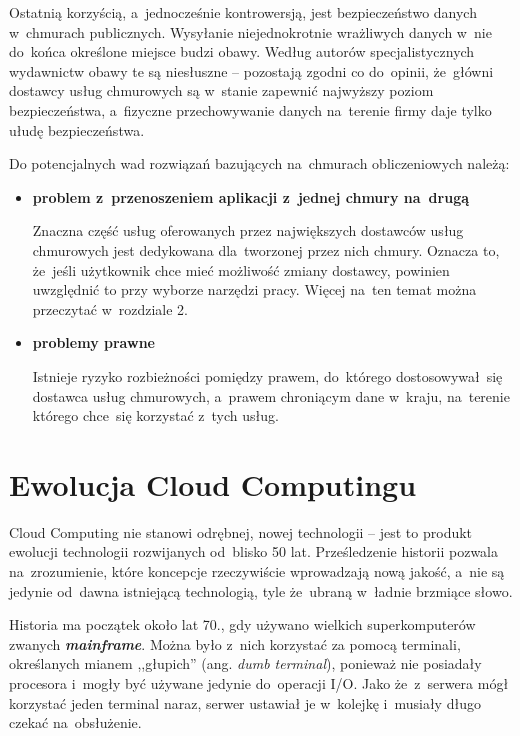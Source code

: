 \documentclass[12pt,a4paper,twoside,titlepage,openright]{book}
\begin{document}
Ostatnią korzyścią, a~jednocześnie kontrowersją, jest bezpieczeństwo danych w~chmurach publicznych. Wysyłanie niejednokrotnie wrażliwych danych w~nie do~końca określone miejsce budzi obawy. Według autorów specjalistycznych wydawnictw\cite{ccCambridge,ccBiznes} obawy te są niesłuszne -- pozostają zgodni co do~opinii, że~główni dostawcy usług chmurowych są w~stanie zapewnić najwyższy poziom bezpieczeństwa, a~fizyczne przechowywanie danych na~terenie firmy daje tylko ułudę bezpieczeństwa.

Do potencjalnych wad rozwiązań bazujących na~chmurach obliczeniowych należą:

\begin{itemize}

\item \textbf{problem z~przenoszeniem aplikacji z~jednej chmury na~drugą}

Znaczna część usług oferowanych przez największych dostawców usług chmurowych jest dedykowana dla~tworzonej przez nich chmury. Oznacza to, że~jeśli użytkownik chce mieć możliwość zmiany dostawcy, powinien uwzględnić to przy wyborze narzędzi pracy. Więcej na~ten temat można przeczytać w~rozdziale 2.

\item \textbf{problemy prawne}

Istnieje ryzyko rozbieżności pomiędzy prawem, do~którego dostosowywał~się dostawca usług chmurowych, a~prawem chroniącym dane w~kraju, na~terenie którego chce~się korzystać z~tych usług. 

\end{itemize}


\section{Ewolucja Cloud Computingu}

Cloud Computing nie stanowi odrębnej, nowej technologii -- jest to produkt ewolucji technologii rozwijanych od~blisko 50 lat. Prześledzenie historii pozwala na~zrozumienie, które koncepcje rzeczywiście wprowadzają nową jakość, a~nie są jedynie od~dawna istniejącą technologią, tyle że~ubraną w~ładnie brzmiące słowo.


Historia ma początek około lat 70., gdy używano wielkich superkomputerów zwanych \textbf{\textit{mainframe}}. Można było z~nich korzystać za pomocą terminali, określanych mianem ,,głupich'' (ang. \textit{dumb terminal}), ponieważ nie posiadały procesora i~mogły być używane jedynie do~operacji I/O. Jako że~z~serwera mógł korzystać jeden terminal naraz, serwer ustawiał je w~kolejkę i~musiały długo czekać na~obsłużenie.
\end{document}
